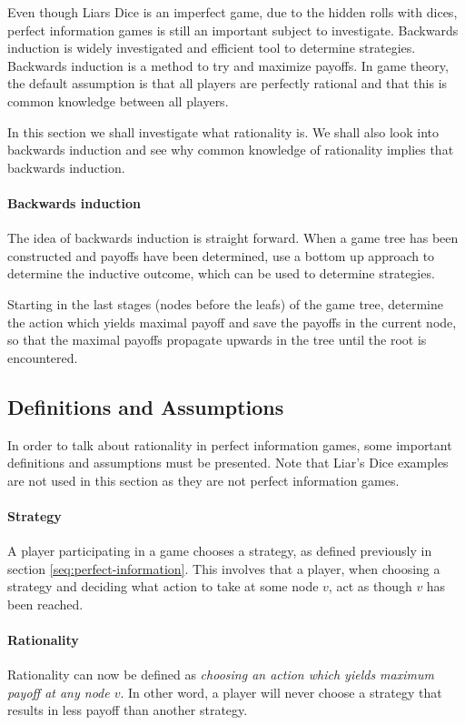Even though Liars Dice is an imperfect game, due to the hidden rolls with dices, perfect information games is still an important subject to investigate. 
Backwards induction is widely investigated and efficient tool to determine strategies. Backwards induction is a method to try and maximize payoffs.
In game theory, the default assumption is that all players are perfectly rational and that this is common knowledge between all players.

In this section we shall investigate what rationality is. We shall also look into backwards induction and see why common knowledge of rationality implies that backwards induction.

\paragraph*{Backwards induction}
The idea of backwards induction is straight forward. When a game tree has been constructed and payoffs have been determined, use a bottom up approach to determine the inductive outcome, which can be used to determine strategies. 

Starting in the last stages (nodes before the leafs) of the game tree, determine the action which yields maximal payoff and save the payoffs in the current node, so that the maximal payoffs propagate upwards in the tree until the root is encountered.

\subsection{Definitions and Assumptions}
In order to talk about rationality in perfect information games, some important definitions and assumptions must be presented. Note that Liar's Dice examples are not used in this section as they are not perfect information games.

\paragraph*{Strategy} A player participating in a game chooses a strategy, as defined previously in section \ref{seq:perfect-information}. This involves that a player, when choosing a strategy and deciding what action to take at some node $v$, act as though $v$ has been reached.

\paragraph*{Rationality} Rationality can now be defined as \textit{choosing an action which yields maximum payoff at any node $v$}. In other word, a player will never choose a strategy that results in less payoff than another strategy.

